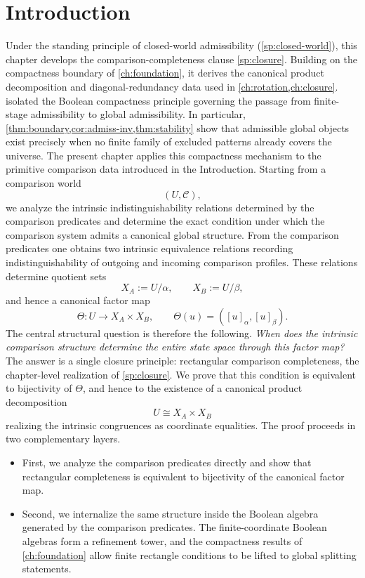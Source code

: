 \section{Introduction}
Under the standing principle of closed-world admissibility
(\cref{sp:closed-world}), this chapter develops the
comparison-completeness clause \cref{sp:closure}.
Building on the compactness boundary of \cref{ch:foundation}, it derives
the canonical product decomposition and diagonal-redundancy data used in
\cref{ch:rotation,ch:closure}.
 isolated the Boolean compactness principle
governing the passage from finite-stage admissibility to global
admissibility.  In particular, \cref{thm:boundary,cor:admiss-inv,thm:stability}
show that admissible global objects exist precisely when no finite
family of excluded patterns already covers the universe.
The present chapter applies this compactness mechanism to the primitive
comparison data introduced in the Introduction.  Starting from a
comparison world
\[
	(U,\mathcal C),
\]
we analyze the intrinsic indistinguishability relations determined by
the comparison predicates and determine the exact condition under which
the comparison system admits a canonical global structure.
From the comparison predicates one obtains two intrinsic equivalence
relations recording indistinguishability of outgoing and incoming
comparison profiles.  These relations determine quotient sets
\[
	X_A := U/\alpha,
	\qquad
	X_B := U/\beta ,
\]
and hence a canonical factor map
\begin{equation}
	\label{eq:Theta}
	\Theta : U \to X_A \times X_B,
	\qquad
	\Theta(u) = ([u]_\alpha,[u]_\beta).
\end{equation}
The central structural question is therefore the following.
\medskip
\noindent
\emph{When does the intrinsic comparison structure determine the
	entire state space through this factor map?}
\medskip
The answer is a single closure principle: rectangular comparison
completeness, the chapter-level realization of
\cref{sp:closure}. We prove that this condition is equivalent to bijectivity
of \(\Theta\), and hence to the existence of a canonical product
decomposition
\[
	U \cong X_A \times X_B
\]
realizing the intrinsic congruences as coordinate equalities.
The proof proceeds in two complementary layers.
\begin{itemize}
	\item First, we analyze the comparison predicates directly and show
	      that rectangular completeness is equivalent to bijectivity of the
	      canonical factor map.
	\item Second, we internalize the same structure inside the Boolean
	      algebra generated by the comparison predicates.  The finite-coordinate
	      Boolean algebras form a refinement tower, and the compactness results
	      of \cref{ch:foundation} allow finite rectangle conditions to be lifted
	      to global splitting statements.
\end{itemize}
